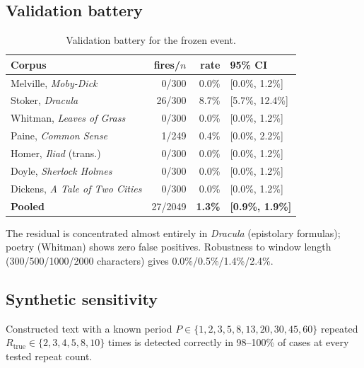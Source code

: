\subsection{Validation battery}
\begin{table}[ht]
\centering
\caption{Validation battery for the frozen event.}
\label{tab:validation}
\begin{tabular}{@{}lrrl@{}}
\toprule
Corpus & fires/$n$ & rate & 95\% CI \\
\midrule
Melville, \emph{Moby-Dick}      & 0/300  & 0.0\% & [0.0\%, 1.2\%] \\
Stoker, \emph{Dracula}          & 26/300 & 8.7\% & [5.7\%, 12.4\%] \\
Whitman, \emph{Leaves of Grass} & 0/300  & 0.0\% & [0.0\%, 1.2\%] \\
Paine, \emph{Common Sense}      & 1/249  & 0.4\% & [0.0\%, 2.2\%] \\
Homer, \emph{Iliad} (trans.)    & 0/300  & 0.0\% & [0.0\%, 1.2\%] \\
Doyle, \emph{Sherlock Holmes}   & 0/300  & 0.0\% & [0.0\%, 1.2\%] \\
Dickens, \emph{A Tale of Two Cities} & 0/300 & 0.0\% & [0.0\%, 1.2\%] \\
\midrule
\textbf{Pooled}                 & 27/2049 & \textbf{1.3\%} & \textbf{[0.9\%, 1.9\%]} \\
\bottomrule
\end{tabular}
\end{table}
The residual is concentrated almost entirely in \emph{Dracula} (epistolary formulas); poetry (Whitman) shows zero false positives. Robustness to window length (300/500/1000/2000 characters) gives 0.0\%/0.5\%/1.4\%/2.4\%.

\subsection{Synthetic sensitivity}
Constructed text with a known period $P\in\{1,\allowbreak2,\allowbreak3,\allowbreak5,\allowbreak8,\allowbreak13,\allowbreak20,\allowbreak30,\allowbreak45,\allowbreak60\}$ repeated $R_{\text{true}}\in\{2,\allowbreak3,\allowbreak4,\allowbreak5,\allowbreak8,\allowbreak10\}$ times is detected correctly in 98--100\% of cases at every tested repeat count.


